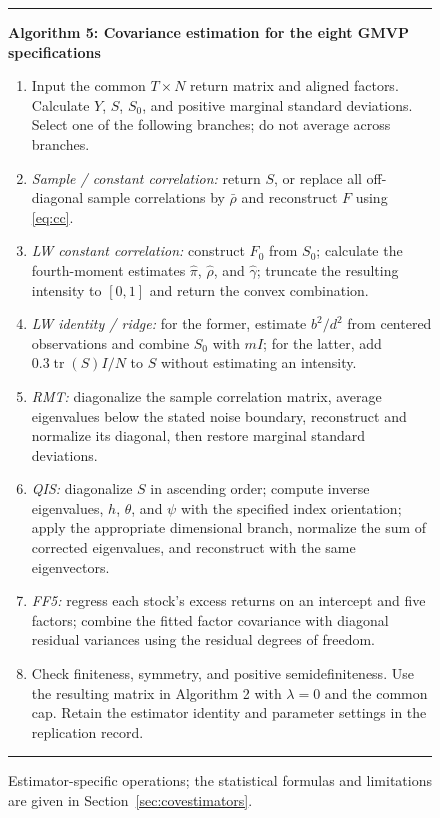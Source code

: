 \documentclass[letterpaper,journal]{IEEEtran}
\begin{document}
\begin{figure}[t]\centering
\begin{minipage}{0.96\textwidth}\hrule\smallskip
\textbf{Algorithm 5: Covariance estimation for the eight GMVP specifications}\smallskip
\begin{enumerate}\setlength{\itemsep}{1pt}
\item Input the common $T\times N$ return matrix and aligned factors. Calculate $Y$, $S$, $S_0$, and positive marginal standard deviations. Select one of the following branches; do not average across branches.
\item \emph{Sample / constant correlation:} return $S$, or replace all off-diagonal sample correlations by $\bar\rho$ and reconstruct $F$ using \eqref{eq:cc}.
\item \emph{LW constant correlation:} construct $F_0$ from $S_0$; calculate the fourth-moment estimates $\widehat\pi$, $\widehat\rho$, and $\widehat\gamma$; truncate the resulting intensity to $[0,1]$ and return the convex combination.
\item \emph{LW identity / ridge:} for the former, estimate $b^2/d^2$ from centered observations and combine $S_0$ with $mI$; for the latter, add $0.3\operatorname{tr}(S)I/N$ to $S$ without estimating an intensity.
\item \emph{RMT:} diagonalize the sample correlation matrix, average eigenvalues below the stated noise boundary, reconstruct and normalize its diagonal, then restore marginal standard deviations.
\item \emph{QIS:} diagonalize $S$ in ascending order; compute inverse eigenvalues, $h$, $\theta$, and $\psi$ with the specified index orientation; apply the appropriate dimensional branch, normalize the sum of corrected eigenvalues, and reconstruct with the same eigenvectors.
\item \emph{FF5:} regress each stock's excess returns on an intercept and five factors; combine the fitted factor covariance with diagonal residual variances using the residual degrees of freedom.
\item Check finiteness, symmetry, and positive semidefiniteness. Use the resulting matrix in Algorithm 2 with $\lambda=0$ and the common cap. Retain the estimator identity and parameter settings in the replication record.
\end{enumerate}\hrule
\end{minipage}
\caption{Estimator-specific operations; the statistical formulas and limitations are given in Section~\ref{sec:covestimators}.}\label{alg:covariance}
\end{figure}
\end{document}
